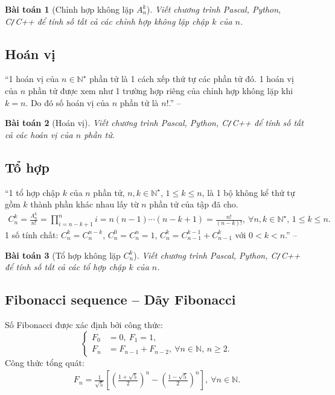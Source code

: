 \documentclass{article}
\newtheorem{baitoan}{Bài toán}
\begin{document}
\begin{baitoan}[Chỉnh hợp không lặp $A_n^k$]
	Viết chương trình {\sf Pascal, Python, C\texttt{/}C++} để tính số tất cả các chỉnh hợp không lặp chập $k$ của $n$.
\end{baitoan}

\subsection{Hoán vị}
``1 hoán vị của $n\in\mathbb{N}^\star$ phần tử là 1 cách xếp thứ tự các phần tử đó. 1 hoán vị của $n$ phần tử được xem như 1 trường hợp riêng của chỉnh hợp không lặp khi $k = n$. Do đó số hoán vị của $n$ phần tử là $n!$.'' -- \cite[Sect. 4.9, p. 21]{TLGK_chuyen_Tin_quyen_1}

\begin{baitoan}[Hoán vị]
	Viết chương trình {\sf Pascal, Python, C\texttt{/}C++} để tính số tất cả các hoán vị của $n$ phần tử.
\end{baitoan}

\subsection{Tổ hợp}
``1 tổ hợp chập $k$ của $n$ phần tử, $n,k\in\mathbb{N}^\star$, $1\le k\le n$, là 1 bộ không kể thứ tự gồm $k$ thành phần khác nhau lấy từ $n$ phần tử của tập đã cho.
\begin{align*}
	C_n^k = \frac{A_n^k}{n!} = \prod_{i=n-k+1}^n i = n(n - 1)\cdots(n - k + 1) = \frac{n!}{(n - k)!},\ \forall n,k\in\mathbb{N}^\star,\,1\le k\le n.
\end{align*}
1 số tính chất: $C_n^k =  C_n^{n-k}$, $C_n^0 = C_n^n = 1$, $C_n^k = C_{n-1}^{k-1} + C_{n-1}^k$ với $0 < k < n$.'' -- \cite[Sect. 4.10, p. 21]{TLGK_chuyen_Tin_quyen_1}

\begin{baitoan}[Tổ hợp không lặp $C_n^k$]
	Viết chương trình {\sf Pascal, Python, C\texttt{/}C++} để tính số tất cả các tổ hợp chập $k$ của $n$.
\end{baitoan}

\subsection{Fibonacci sequence -- Dãy Fibonacci}
Số Fibonacci được xác định bởi công thức:
\begin{equation*}
	\left\{\begin{split}
		F_0 &= 0,\ F_1 = 1,\\
		F_n &= F_{n-1} + F_{n-2},\ \forall n\in\mathbb{N},\,n\ge2.
	\end{split}\right.
\end{equation*}
Công thức tổng quát:
\begin{align*}
	F_n = \frac{1}{\sqrt{5}}\left[\left(\frac{1 + \sqrt{5}}{2}\right)^n - \left(\frac{1 - \sqrt{5}}{2}\right)^n\right],\ \forall n\in\mathbb{N}.
\end{align*}
\end{document}
